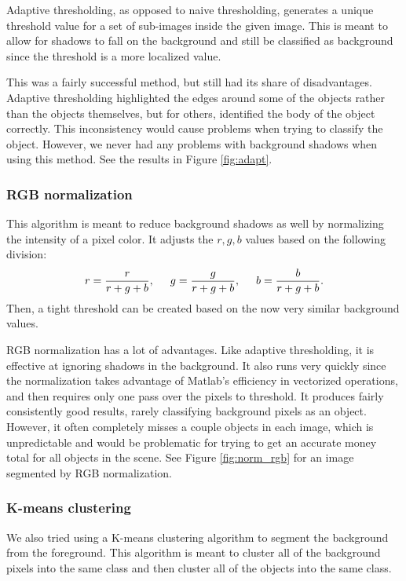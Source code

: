 \documentclass[12pt]{article}
\begin{document}
Adaptive thresholding, as opposed to naive thresholding, generates a unique threshold value for a set of sub-images inside the given image. This is meant to allow for shadows to fall on the background and still be classified as background since the threshold is a more localized value.

This was a fairly successful method, but still had its share of disadvantages. Adaptive thresholding highlighted the edges around some of the objects rather than the objects themselves, but for others, identified the body of the object correctly. This inconsistency would cause problems when trying to classify the object. However, we never had any problems with background shadows when using this method. See the results in Figure \ref{fig:adapt}.

\subsubsection{RGB normalization}

This algorithm is meant to reduce background shadows as well by normalizing the intensity of a pixel color. It adjusts the $r,g,b$ values based on the following division:
\[r=\frac{r}{r+g+b},\hspace{5mm}g=\frac{g}{r+g+b},\hspace{5mm}b=\frac{b}{r+g+b}.\]
Then, a tight threshold can be created based on the now very similar background values. 

RGB normalization has a lot of advantages. Like adaptive thresholding, it is effective at ignoring shadows in the background. It also runs very quickly since the normalization takes advantage of Matlab's efficiency in vectorized operations, and then requires only one pass over the pixels to threshold. It produces fairly consistently good results, rarely classifying background pixels as an object. However, it often completely misses a couple objects in each image, which is unpredictable and would be problematic for trying to get an accurate money total for all objects in the scene. See Figure \ref{fig:norm_rgb} for an image segmented by RGB normalization.

\subsubsection{K-means clustering}

We also tried using a K-means clustering algorithm to segment the background from the foreground. This algorithm is meant to cluster all of the background pixels into the same class and then cluster all of the objects into the same class.
\end{document}
